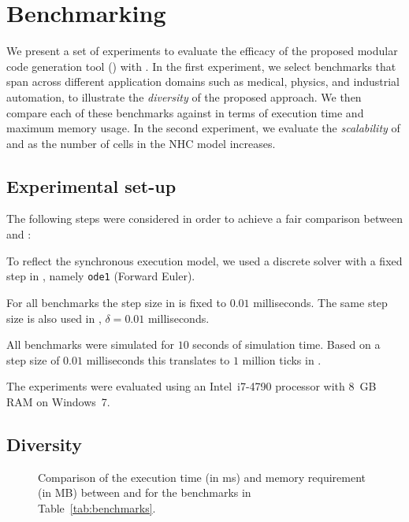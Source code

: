 \section{Benchmarking}
\label{sec:benchmarking}


We present a set of experiments to evaluate the efficacy of the proposed modular code generation tool (\ourTool) with \simulink. 
In the first experiment, we select benchmarks that span across different application domains such as medical, physics, and industrial automation, to illustrate the \emph{diversity} of the proposed approach.
We then compare each of these benchmarks against \simulink in terms of execution time and maximum memory usage.
In the second experiment, we evaluate the \emph{scalability} of \ourTool and \simulink as the number of cells in the \ac{NHC} model increases. 


\subsection{Experimental set-up}
\label{sec:experimentalSetUp}
The following steps were considered in order to achieve a fair comparison between \ourTool and \simulink:

\begin{description}
	\item[\textbf{Solver}] To reflect the synchronous execution model, we used a discrete solver with a fixed step in \simulink, namely \texttt{ode1} (Forward Euler).
	
	\item[\textbf{Step Size}] For all benchmarks the step size in \simulink is fixed to $0.01$ milliseconds.
	The same step size is also used in \ourTool, $\delta = 0.01$ milliseconds.
	
	\item[\textbf{Time}] All benchmarks were simulated for $10$ seconds of simulation time.
	Based on a step size of $0.01$ milliseconds this translates to $1$ million ticks in \ourTool.
\end{description}

The experiments were evaluated using an Intel~i7-4790 processor with 8~GB RAM on Windows~7. 


\subsection{Diversity}

\begin{figure}[htbp]
	\centering
	\caption{Comparison of the execution time (in ms) and memory requirement (in MB) between \simulink and \ourTool for the benchmarks in Table~\ref{tab:benchmarks}.}
	\label{fig:results}
\end{figure}

